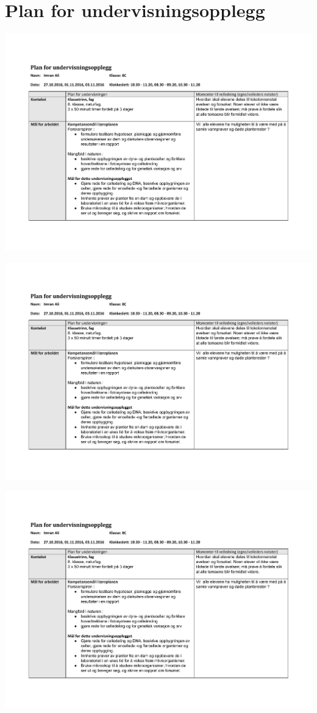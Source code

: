 \documentclass[main.tex]{subfiles}
\begin{document}
\section{Plan for undervisningsopplegg}
\hspace{-2cm}\vspace*{-3cm}\includegraphics[page = 1,scale = 1,angle=90]{../figures/Del_B_plan_for_undervisningsopplegg.pdf}

\hspace{-3cm}\vspace*{-3cm}\includegraphics[page = 2,scale = 1,angle=90]{../figures/Del_B_plan_for_undervisningsopplegg.pdf}

\hspace{-2cm}\vspace*{-3cm}\includegraphics[page = 3,scale = 1,angle=90]{../figures/Del_B_plan_for_undervisningsopplegg.pdf}
\end{document}
